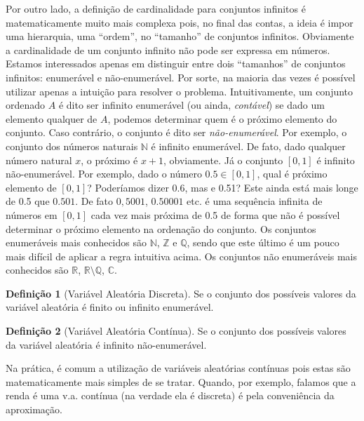 \documentclass[
]{book}
\theoremstyle{definition}
\newtheorem{definition}{Definição}[chapter]
\theoremstyle{definition}
\theoremstyle{definition}
\theoremstyle{remark}
\begin{document}
Por outro lado, a definição de cardinalidade para conjuntos infinitos é matematicamente muito mais complexa pois, no final das contas, a ideia é impor uma hierarquia, uma ``ordem'', no ``tamanho'' de conjuntos infinitos. Obviamente a cardinalidade de um conjunto infinito não pode ser expressa em números. Estamos interessados apenas em distinguir entre dois ``tamanhos'' de conjuntos infinitos: enumerável e não-enumerável. Por sorte, na maioria das vezes é possível utilizar apenas a intuição para resolver o problema. Intuitivamente, um conjunto ordenado \(A\) é dito ser infinito
enumerável (ou ainda, \emph{contável}) se dado um elemento qualquer de \(A\), podemos determinar quem é o próximo elemento do conjunto. Caso contrário, o conjunto é dito ser \emph{não-enumerável}. Por exemplo, o conjunto dos números naturais \(\mathbb{N}\) é infinito enumerável. De fato, dado qualquer número natural \(x\), o próximo é \(x+1\), obviamente. Já o conjunto \([0,1]\) é infinito não-enumerável. Por exemplo, dado o número \(0.5\in[0,1]\), qual é próximo elemento de \([0,1]\)? Poderíamos dizer 0.6, mas e 0.51? Este ainda está mais longe de 0.5 que \(0.501\). De fato \(0,5001\), \(0.50001\) etc. é uma sequência infinita de números em \([0,1]\) cada vez mais próxima de 0.5 de forma que não é possível determinar o próximo elemento na ordenação do conjunto.
Os conjuntos enumeráveis mais conhecidos são \(\mathbb{N}\), \(\mathbb{Z}\) e \(\mathbb{Q}\), sendo que este último é um pouco mais difícil de aplicar a regra intuitiva acima. Os conjuntos não enumeráveis mais conhecidos são \(\mathbb{R}\), \(\mathbb{R}\setminus\mathbb{Q}\), \(\mathbb{C}\).

\begin{definition}[Variável Aleatória Discreta]
\protect\hypertarget{def:vad}{}{\label{def:vad} {} }Se o conjunto dos possíveis valores da variável aleatória é finito ou infinito enumerável.
\end{definition}

\begin{definition}[Variável Aleatória Contínua]
\protect\hypertarget{def:vac}{}{\label{def:vac} {} }Se o conjunto dos possíveis valores da variável aleatória é infinito não-enumerável.
\end{definition}

Na prática, é comum a utilização de variáveis aleatórias contínuas pois estas são matematicamente mais simples de se tratar. Quando, por exemplo, falamos que a renda é uma v.a. contínua (na verdade ela é
discreta) é pela conveniência da aproximação.
\end{document}
